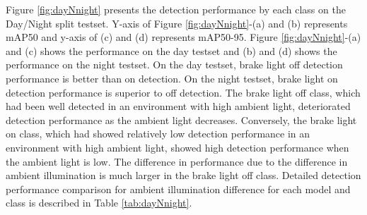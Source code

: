 Figure \ref{fig:dayNnight} presents the detection performance by each class on the Day/Night split testset. 
Y-axis of Figure \ref{fig:dayNnight}-(a) and (b) represents mAP50 and y-axis of (c) and (d) represents mAP50-95.
Figure \ref{fig:dayNnight}-(a) and (c) shows the performance on the day testset and (b) and (d) shows the performance on the night testset.
On the day testset, brake light off detection performance is better than on detection.
On the night testset, brake light on detection performance is superior to off detection.
The brake light off class, which had been well detected in an environment with high ambient light, deteriorated detection performance as the ambient light decreases.
Conversely, the brake light on class, which had showed relatively low detection performance in an environment with high ambient light, showed high detection performance when the ambient light is low.
The difference in performance due to the difference in ambient illumination is much larger in the brake light off class.
Detailed detection performance comparison for ambient illumination difference for each model and class is described in Table \ref{tab:dayNnight}.


